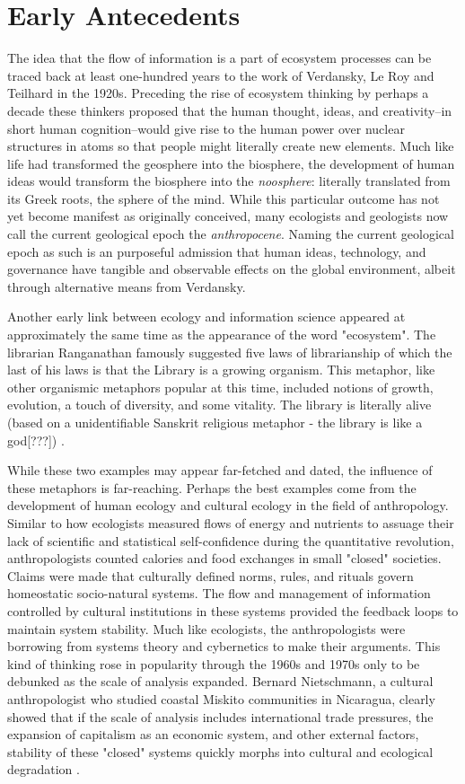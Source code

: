 \section{Early Antecedents}

The idea that the flow of information is a part of ecosystem processes can be traced back at least one-hundred years to the work of Verdansky, Le Roy and Teilhard in the 1920s. Preceding the rise of ecosystem thinking by perhaps a decade these thinkers proposed that the human thought, ideas, and creativity--in short human cognition--would give rise to the human power over nuclear structures in atoms so that people might literally create new elements. Much like life had transformed the geosphere into the biosphere, the development of human ideas would transform the biosphere into the \textit{noosphere}: literally translated from its Greek roots, the sphere of the mind. While this particular outcome has not yet become manifest as originally conceived, many ecologists and geologists now call the current geological epoch the \textit{anthropocene}. Naming the current geological epoch as such is an purposeful admission that human ideas, technology, and governance have tangible and observable effects on the global environment, albeit through alternative means from Verdansky. 

Another early link between ecology and information science appeared at approximately the same time as the appearance of the word "ecosystem". The librarian Ranganathan famously suggested five laws of librarianship of which the last of his laws is that the Library is a growing organism. This metaphor, like other organismic metaphors popular at this time, included notions of growth, evolution, a touch of diversity, and some vitality. The library is literally alive (based on a unidentifiable Sanskrit religious metaphor - the library is like a god[???]) \citep{ranganathan_1931}.

While these two examples may appear far-fetched and dated, the influence of these metaphors is far-reaching. Perhaps the best examples come from the development of human ecology and cultural ecology in the field of anthropology. Similar to how ecologists measured flows of energy and nutrients to assuage their lack of scientific and statistical self-confidence during the quantitative revolution, anthropologists counted calories and food exchanges in small "closed" societies. Claims were made that culturally defined norms, rules, and rituals govern homeostatic socio-natural systems. The flow and management of information controlled by cultural institutions in these systems provided the feedback loops to maintain system stability. Much like ecologists, the anthropologists were borrowing from systems theory and cybernetics to make their arguments. This kind of thinking rose in popularity through the 1960s and 1970s only to be debunked as the scale of analysis expanded. Bernard Nietschmann, a cultural anthropologist who studied coastal Miskito communities in Nicaragua, clearly showed that if the scale of analysis includes international trade pressures, the expansion of capitalism as an economic system, and other external factors, stability of these "closed" systems quickly morphs into cultural and ecological degradation \citep{nietschmannn_1973}.

